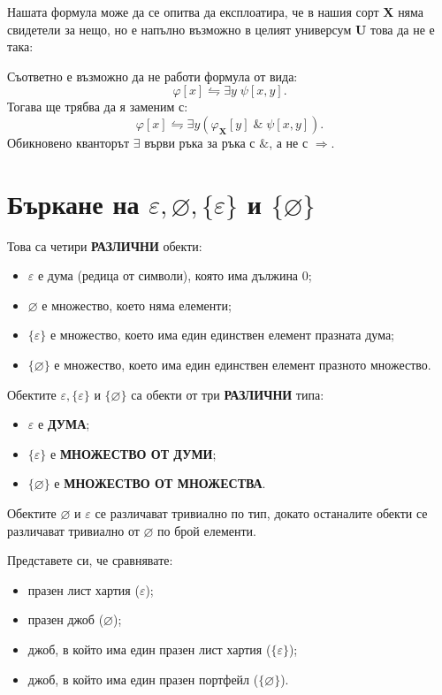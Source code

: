 \documentclass[12pt]{article}
\newcommand{\logand}{\; \& \;}
\theoremstyle{definition}
\begin{document}
Нашата формула може да се опитва да експлоатира, че в нашия сорт \textbf{X} няма свидетели за нещо, но е напълно възможно в целият универсум \textbf{U} това да не е така:
\begin{center}
\end{center}
Съответно е възможно да не работи формула от вида:
\[
  \varphi[x] \leftrightharpoons \exists y \; \psi[x, y].
\]
Тогава ще трябва да я заменим с:
\[
  \varphi[x] \leftrightharpoons \exists y (\varphi_{\textbf{X}}[y] \logand \psi[x, y]).
\]
Обикновено кванторът $\exists$ върви ръка за ръка с $\&$, а не с $\Rightarrow$.

\section{Бъркане на $\varepsilon, \varnothing, \{ \varepsilon \}$ и $\{ \varnothing \}$}

Това са четири \textbf{РАЗЛИЧНИ} обекти:
\begin{itemize}
  \item $\varepsilon$ е дума (редица от символи), която има дължина $0$;
  \item $\varnothing$ е множество, което няма елементи;
  \item $\{ \varepsilon \}$ е множество, което има един единствен елемент празната дума;
  \item $\{ \varnothing \}$ е множество, което има един единствен елемент празното множество.
\end{itemize}
Обектите $\varepsilon, \{ \varepsilon \}$ и $\{ \varnothing \}$ са обекти от три \textbf{РАЗЛИЧНИ} типа:
\begin{itemize}
  \item $\varepsilon$ е \textbf{ДУМА};
  \item $\{ \varepsilon \}$ е \textbf{МНОЖЕСТВО ОТ ДУМИ};
  \item $\{ \varnothing\}$ е \textbf{МНОЖЕСТВО ОТ МНОЖЕСТВА}.
\end{itemize}
Обектите $\varnothing$ и $\varepsilon$ се различават тривиално по тип, докато останалите обекти се различават тривиално от $\varnothing$ по брой елементи.

Представете си, че сравнявате:
\begin{itemize}
  \item празен лист хартия ($\varepsilon$);
  \item празен джоб ($\varnothing$);
  \item джоб, в който има един празен лист хартия ($\{ \varepsilon \}$);
  \item джоб, в който има един празен портфейл ($\{ \varnothing \}$).
\end{itemize}
\end{document}
